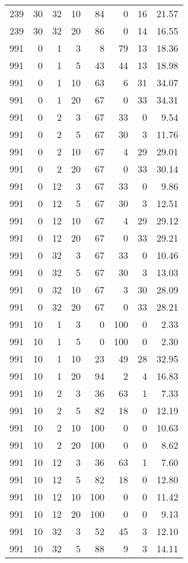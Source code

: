 \begin{tabular}{rrrrrrrr}
239 & 30 & 32 & 10 & 84 & 0 & 16 & 21.57 \\
239 & 30 & 32 & 20 & 86 & 0 & 14 & 16.55 \\
991 & 0 & 1 & 3 & 8 & 79 & 13 & 18.36 \\
991 & 0 & 1 & 5 & 43 & 44 & 13 & 18.98 \\
991 & 0 & 1 & 10 & 63 & 6 & 31 & 34.07 \\
991 & 0 & 1 & 20 & 67 & 0 & 33 & 34.31 \\
991 & 0 & 2 & 3 & 67 & 33 & 0 & 9.54 \\
991 & 0 & 2 & 5 & 67 & 30 & 3 & 11.76 \\
991 & 0 & 2 & 10 & 67 & 4 & 29 & 29.01 \\
991 & 0 & 2 & 20 & 67 & 0 & 33 & 30.14 \\
991 & 0 & 12 & 3 & 67 & 33 & 0 & 9.86 \\
991 & 0 & 12 & 5 & 67 & 30 & 3 & 12.51 \\
991 & 0 & 12 & 10 & 67 & 4 & 29 & 29.12 \\
991 & 0 & 12 & 20 & 67 & 0 & 33 & 29.21 \\
991 & 0 & 32 & 3 & 67 & 33 & 0 & 10.46 \\
991 & 0 & 32 & 5 & 67 & 30 & 3 & 13.03 \\
991 & 0 & 32 & 10 & 67 & 3 & 30 & 28.09 \\
991 & 0 & 32 & 20 & 67 & 0 & 33 & 28.21 \\
991 & 10 & 1 & 3 & 0 & 100 & 0 & 2.33 \\
991 & 10 & 1 & 5 & 0 & 100 & 0 & 2.30 \\
991 & 10 & 1 & 10 & 23 & 49 & 28 & 32.95 \\
991 & 10 & 1 & 20 & 94 & 2 & 4 & 16.83 \\
991 & 10 & 2 & 3 & 36 & 63 & 1 & 7.33 \\
991 & 10 & 2 & 5 & 82 & 18 & 0 & 12.19 \\
991 & 10 & 2 & 10 & 100 & 0 & 0 & 10.63 \\
991 & 10 & 2 & 20 & 100 & 0 & 0 & 8.62 \\
991 & 10 & 12 & 3 & 36 & 63 & 1 & 7.60 \\
991 & 10 & 12 & 5 & 82 & 18 & 0 & 12.80 \\
991 & 10 & 12 & 10 & 100 & 0 & 0 & 11.42 \\
991 & 10 & 12 & 20 & 100 & 0 & 0 & 9.13 \\
991 & 10 & 32 & 3 & 52 & 45 & 3 & 12.10 \\
991 & 10 & 32 & 5 & 88 & 9 & 3 & 14.11 \\

\end{tabular}
